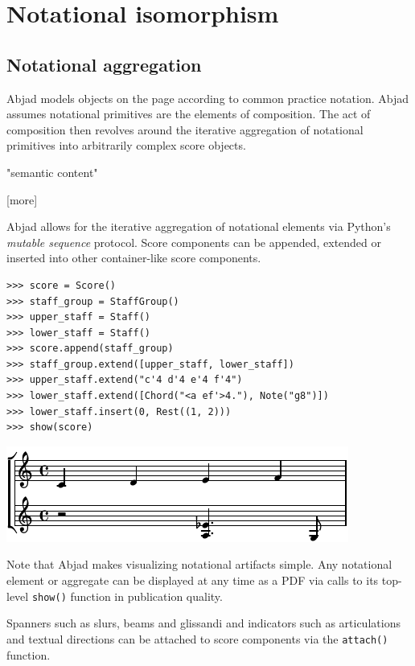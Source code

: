 \section{Notational isomorphism}\label{sec:notational_isomorphism}

\subsection{Notational aggregation}

Abjad models objects on the page according to common practice notation. Abjad
assumes notational primitives are the elements of composition. The act of
composition then revolves around the iterative aggregation of notational
primitives into arbitrarily complex score objects.

"semantic content"

[more]

Abjad allows for the iterative aggregation of notational elements via Python's
\emph{mutable sequence} protocol. Score components can be appended, extended or
inserted into other container-like score components.

\begin{lstlisting}
>>> score = Score()
>>> staff_group = StaffGroup()
>>> upper_staff = Staff()
>>> lower_staff = Staff()
>>> score.append(staff_group)
>>> staff_group.extend([upper_staff, lower_staff])
>>> upper_staff.extend("c'4 d'4 e'4 f'4")
>>> lower_staff.extend([Chord("<a ef'>4."), Note("g8")])
>>> lower_staff.insert(0, Rest((1, 2)))
>>> show(score)
\end{lstlisting}

\includegraphics[scale=1.0]{images/section_2_notational_isomorphism-1.pdf}


Note that Abjad makes visualizing notational artifacts simple. Any notational
element or aggregate can be displayed at any time as a PDF via calls to its
top-level \texttt{show()} function in publication quality.

Spanners such as slurs, beams and glissandi and indicators such as
articulations and textual directions can be attached to score components via
the \texttt{attach()} function.

